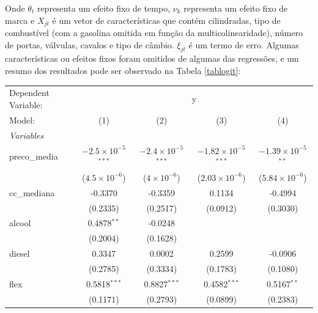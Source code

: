 \documentclass{article}
\begin{document}
Onde $\theta_t$ representa um efeito fixo de tempo, $\nu_k$ representa um efeito fixo de marca e $X_{jt}$ é um vetor de características que contém cilindradas, tipo de combustível (com a gasolina omitida em função da multicolinearidade), número de portas, válvulas, cavalos e tipo de câmbio. $\xi_{jt}$ é um termo de erro. Algumas características ou efeitos fixos foram omitidos de algumas das regressões, e um resumo dos resultados pode ser observado na Tabela \ref{tablogit}:
\begin{table}[H]

\begingroup
\centering
\begin{tabular}{lcccc}
   \tabularnewline \midrule \midrule
   Dependent Variable: & \multicolumn{4}{c}{y}\\
   Model:        & (1)                           & (2)                           & (3)                            & (4)\\  
   \midrule
   \emph{Variables}\\
   preco\_media  & $-2.5\times 10^{-5}$$^{***}$  & $-2.4\times 10^{-5}$$^{***}$  & $-1.82\times 10^{-5}$$^{***}$  & $-1.39\times 10^{-5}$$^{**}$\\    
                 & ($4.5\times 10^{-6}$)         & ($4\times 10^{-6}$)           & ($2.03\times 10^{-6}$)         & ($5.84\times 10^{-6}$)\\    
   cc\_mediana   & -0.3370                       & -0.3359                       & 0.1134                         & -0.4994\\   
                 & (0.2335)                      & (0.2517)                      & (0.0912)                       & (0.3030)\\   
   alcool        & 0.4878$^{**}$                 & -0.0248                       &                                &   \\   
                 & (0.2004)                      & (0.1628)                      &                                &   \\   
   diesel        & 0.3347                        & 0.0002                        & 0.2599                         & -0.0906\\   
                 & (0.2785)                      & (0.3334)                      & (0.1783)                       & (0.1080)\\   
   flex          & 0.5818$^{***}$                & 0.8827$^{***}$                & 0.4582$^{***}$                 & 0.5167$^{**}$\\   
                 & (0.1171)                      & (0.2793)                      & (0.0899)                       & (0.2383)\\   

\end{tabular}
\end{table}
\end{document}
